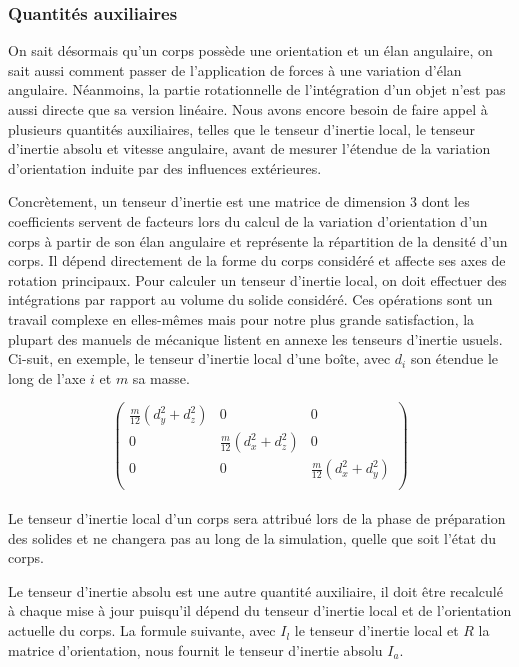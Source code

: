 \subsubsection{Quantités auxiliaires}

On sait désormais qu'un corps possède une orientation et un élan
angulaire, on sait aussi comment passer de l'application de forces à
une variation d'élan angulaire. Néanmoins, la partie rotationnelle de
l'intégration d'un objet n'est pas aussi directe que sa version
linéaire. Nous avons encore besoin de faire appel à plusieurs
quantités auxiliaires, telles que le tenseur d'inertie local, le
tenseur d'inertie absolu et vitesse angulaire, avant de mesurer
l'étendue de la variation d'orientation induite par des influences
extérieures.

Concrètement, un tenseur d'inertie est une matrice de dimension 3 dont
les coefficients servent de facteurs lors du calcul de la variation
d'orientation d'un corps à partir de son élan angulaire et représente
la répartition de la densité d'un corps. Il dépend directement de la
forme du corps considéré et affecte ses axes de rotation
principaux. Pour calculer un tenseur d'inertie local, on doit
effectuer des intégrations par rapport au volume du solide
considéré. Ces opérations sont un travail complexe en elles-mêmes mais
pour notre plus grande satisfaction, la plupart des manuels de
mécanique listent en annexe les tenseurs d'inertie usuels. Ci-suit, en
exemple, le tenseur d'inertie local d'une boîte, avec $d_i$ son
étendue le long de l'axe $i$ et $m$ sa masse.

\[
\begin{pmatrix}
  \frac{m}{12}(d_y^2 + d_z^2) & 0 & 0 \\
  0 & \frac{m}{12}(d_x^2 + d_z^2) & 0 \\
  0 & 0 & \frac{m}{12}(d_x^2 + d_y^2) \\
\end{pmatrix}
\] \\

Le tenseur d'inertie local d'un corps sera attribué lors de la phase
de préparation des solides et ne changera pas au long de la
simulation, quelle que soit l'état du corps.

Le tenseur d'inertie absolu est une autre quantité auxiliaire, il doit
être recalculé à chaque mise à jour puisqu'il dépend du tenseur
d'inertie local et de l'orientation actuelle du corps. La formule
suivante, avec $I_l$ le tenseur d'inertie local et $R$ la matrice
d'orientation, nous fournit le tenseur d'inertie absolu $I_{a}$.

